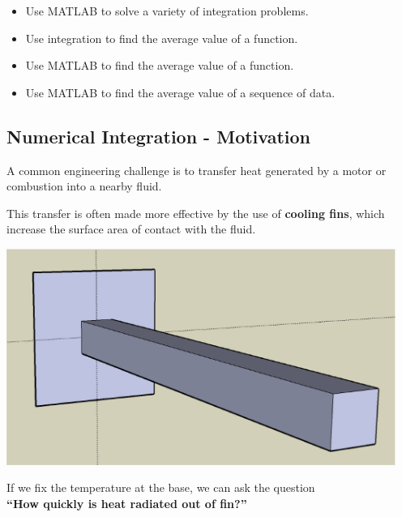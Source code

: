 



\setfont
\pagestyle{fancy}
\renewcommand{\Week}{6 }
\renewcommand{\WeekTitle}{\WeekTitleSix }

\fancyhead[LE,RO]{Week \Week}  %
\fancyfoot{}
\sectionbox{Week \#\Week: \WeekTitle}


\vspace{5mm}
\goals
\begin{itemize}
\item Use MATLAB to solve a variety of integration problems. 
\item Use integration to find the average value of a function.
\item Use MATLAB to find the average value of a function. 
\item Use MATLAB to find the average value of a sequence of data. 
\end{itemize}
\vspace{5mm}


\subsection*{Numerical Integration - Motivation}
A common engineering challenge is to transfer heat generated by a
motor or combustion into a nearby fluid.

This transfer is often made more effective by the use of {\bf cooling
  fins}, which increase the surface area of contact with the fluid.

\begin{center}
  \includegraphics[width=5in]{graphics/notes_06_LongPin3D}
\end{center}

If we fix the temperature at the base, we can ask the question \\
{\bf ``How quickly is heat radiated out of fin?''}

